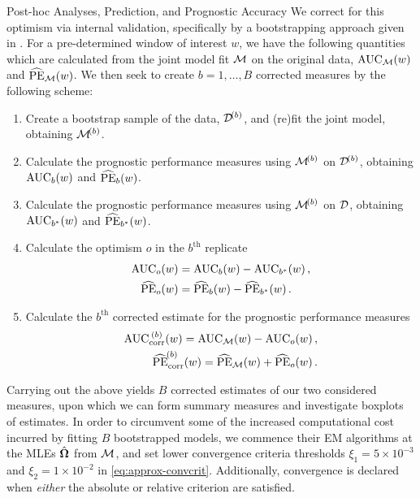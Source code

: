 \begin{chapter}{\label{cha:posthoc}Post-hoc Analyses, Prediction, and Prognostic Accuracy}
We correct for this optimism via internal validation, specifically by a bootstrapping approach given in \citet{Andrinopoulou2021}. For a pre-determined window of interest $w$, we have the following quantities which are calculated from the joint model fit $\cal M$ on the original data, $\mathrm{AUC}_{\mathcal{M}}\!\left( w\right)$ and $\widehat{\mathrm{PE}}_{\mathcal{M}}\!\left( w\right)$. We then seek to create $b=1,\dots,B$ corrected measures by the following scheme:
\begin{enumerate}
    \item Create a bootstrap sample of the data, $\mathcal{D}^{\!\left( b\right)}$, and (re)fit the joint model, obtaining $\mathcal{M}^{\!\left( b\right)}$.
    \item Calculate the prognostic performance measures using $\mathcal{M}^{\!\left( b\right)}$ on $\mathcal{D}^{\!\left( b\right)}$, obtaining $\mathrm{AUC}_b\!\left( w\right)$ and $\widehat{\mathrm{PE}}_b\!\left( w\right)$. 
    \item Calculate the prognostic performance measures using $\mathcal{M}^{\!\left( b\right)}$ on $\cal D$, obtaining $\mathrm{AUC}_{b^*}\!\left( w\right)$ and $\widehat{\mathrm{PE}}_{b^*}\!\left( w\right)$.
    \item Calculate the optimism $o$ in the $b^{\mathrm{th}}$ replicate 
    \begin{align*}
        \mathrm{AUC}_{o}\!\left( w\right) &= \mathrm{AUC}_{b}\!\left( w\right)-\mathrm{AUC}_{b^*}\!\left( w\right),\\
        \widehat{\mathrm{PE}}_o\!\left( w\right) &= \widehat{\mathrm{PE}}_{b}\!\left( w\right)-\widehat{\mathrm{PE}}_{b^*}\!\left( w\right).
    \end{align*}
    \item Calculate the $b^{\mathrm{th}}$ corrected estimate for the prognostic performance measures
    \begin{align*}
        \mathrm{AUC}_{\mathrm{corr}}^{\ \lb b \rb}\lb w\rb = \mathrm{AUC}_{\mathcal{M}}\lb w\rb - \mathrm{AUC}_{o}\lb w\rb,\\
        \widehat{\mathrm{PE}}_{\mathrm{corr}}^{\lb b \rb}\lb w\rb = \widehat{\mathrm{PE}}_{\mathcal{M}}\lb w\rb + \widehat{\mathrm{PE}}_{o}\lb w\rb.
    \end{align*}
\end{enumerate}
Carrying out the above yields $B$ corrected estimates of our two considered measures, upon which we can form summary measures and investigate \eg boxplots of estimates. In order to circumvent some of the increased computational cost incurred by fitting $B$ bootstrapped models, we commence their EM algorithms at the MLEs $\hat{\bm{\Omega}}$ from $\cal M$, and set lower convergence criteria thresholds $\xi_1=5\times10^{-3}$ and $\xi_2=1\times10^{-2}$ in \eqref{eq:approx-convcrit}. Additionally, convergence is declared when \textit{either} the absolute or relative criterion are satisfied.


\end{chapter}
